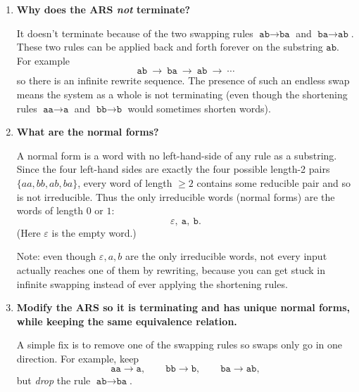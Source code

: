 \documentclass[12pt]{article}
\begin{document}
\begin{enumerate}[label=(\alph*)]
  \item \textbf{Why does the ARS \emph{not} terminate?}
  
  It doesn't terminate because of the two swapping rules \(\texttt{ab}\to\texttt{ba}\) and \(\texttt{ba}\to\texttt{ab}\). These two rules can be applied back and forth forever on the substring \(\texttt{ab}\). For example
  \[
    \texttt{ab}\ \longrightarrow\ \texttt{ba}\ \longrightarrow\ \texttt{ab}\ \longrightarrow\ \cdots
  \]
  so there is an infinite rewrite sequence. The presence of such an endless swap means the system as a whole is not terminating (even though the shortening rules \(\texttt{aa}\to\texttt{a}\) and \(\texttt{bb}\to\texttt{b}\) would sometimes shorten words).
  
  \item \textbf{What are the normal forms?}
  
  A normal form is a word with no left-hand-side of any rule as a substring. Since the four left-hand sides are exactly the four possible length-2 pairs \(\{aa,bb,ab,ba\}\), every word of length \(\ge 2\) contains some reducible pair and so is not irreducible. Thus the only irreducible words (normal forms) are the words of length \(0\) or \(1\):
  \[
    \varepsilon,\ \texttt{a},\ \texttt{b}.
  \]
  (Here \(\varepsilon\) is the empty word.)
  
  Note: even though \(\varepsilon,a,b\) are the only irreducible words, not every input actually reaches one of them by rewriting, because you can get stuck in infinite swapping instead of ever applying the shortening rules.
  
  \item \textbf{Modify the ARS so it is terminating and has unique normal forms, while keeping the same equivalence relation.}
  
  A simple fix is to remove one of the swapping rules so swaps only go in one direction. For example, keep
  \[
    \texttt{aa}\to\texttt{a},\qquad
    \texttt{bb}\to\texttt{b},\qquad
    \texttt{ba}\to\texttt{ab},
  \]
  but \emph{drop} the rule \(\texttt{ab}\to\texttt{ba}\).
  

\end{enumerate}
\end{document}
